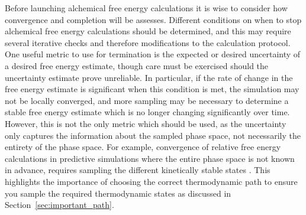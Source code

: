 \documentclass[9pt,bestpractices]{livecoms}
\begin{document}


% 

Before launching alchemical free energy calculations it is wise to consider how convergence and completion will be assesses. Different conditions on when to stop alchemical free energy calculations should be determined, and this may require several iterative checks and therefore modifications to the calculation protocol.
One useful metric to use for termination is the expected or desired uncertainty of a desired free energy estimate, though care must be exercised should the uncertainty estimate prove unreliable.
In particular, if the rate of change in the free energy estimate is significant when this condition is met, the simulation may not be locally converged, and more sampling may be necessary to determine a stable free energy estimate which is no longer changing significantly over time. 
However, this is not the only metric which should be used, as the uncertainty only captures the information about the sampled phase space, not necessarily the entirety of the phase space.  
For example, 
convergence of relative free energy calculations in predictive simulations where the entire phase space is not known in advance, requires sampling the different kinetically stable states . 
This highlights the importance of choosing the correct thermodynamic path to ensure you sample the required thermodynamic states as discussed in Section~\ref{sec:important_path}.
\end{document}
